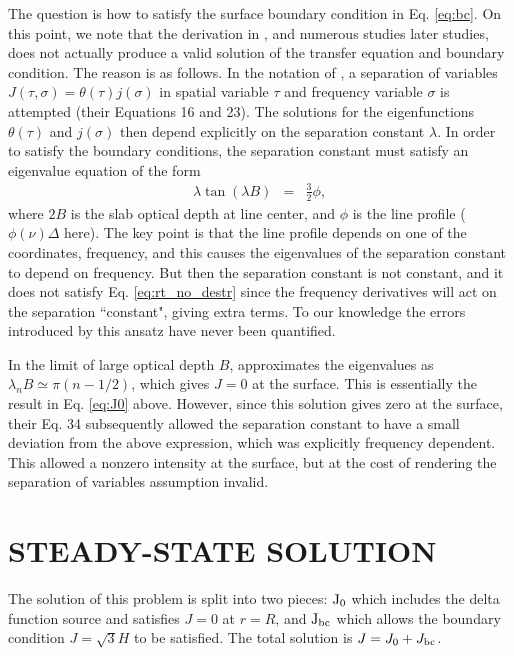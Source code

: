 \documentclass{aastex63}
\newcommand{\be}{\begin{eqnarray}}
\newcommand{\ee}{\end{eqnarray}}
\begin{document}
The question is how to satisfy the surface boundary condition in Eq. \ref{eq:bc}. On this point, we note that the derivation in \citet{1973MNRAS.162...43H}, and numerous studies later studies, does not actually produce a valid solution of the transfer equation and boundary condition. The reason is as follows. In the notation of \citet{1973MNRAS.162...43H}, a separation of variables
$J(\tau,\sigma) = \theta(\tau) j(\sigma)$ in spatial variable $\tau$ and frequency variable $\sigma$ is attempted (their Equations 16 and 23). The solutions for the eigenfunctions $\theta(\tau)$ and $j(\sigma)$ then depend explicitly on the separation constant $\lambda$. In order to satisfy the boundary conditions, the separation constant must satisfy an eigenvalue equation of the form
\be
\lambda \tan(\lambda B) & = & \frac{3}{2} \phi,
\label{eq:evalue}
\ee
where $2B$ is the slab optical depth at line center, and $\phi$ is the line profile ($\phi(\nu)\Delta$ here). The key point is that the line profile depends on one of the coordinates, frequency, and this causes the eigenvalues of the separation constant to depend on frequency. But then the separation constant is not constant, and it does not satisfy Eq. \ref{eq:rt_no_destr} since the frequency derivatives will act on the separation ``constant", giving extra terms. To our knowledge the errors introduced by this ansatz have never been quantified. 

In the limit of large optical depth $B$, \citealt{1973MNRAS.162...43H} approximates the eigenvalues as $\lambda_n B \simeq \pi (n-1/2)$, which gives $J=0$ at the surface. This is essentially the result in Eq. \ref{eq:J0} above. However, since this solution gives zero at the surface, their Eq. 34 subsequently allowed the separation constant to have a small deviation from the above expression, which was explicitly frequency dependent. This allowed a nonzero intensity at the surface, but at the cost of rendering the separation of variables assumption invalid. 

\section{STEADY-STATE SOLUTION}
\label{sec:steadystate}

The solution of this problem is split into two pieces: $\rm J_0$ which includes the delta function source and satisfies $J=0$ at $r=R$, and $\rm J_{bc}$ which allows the boundary condition $J=\sqrt{3}H$ to be satisfied. The total solution is $J = J_0 + J_{\rm bc}$.
\end{document}
